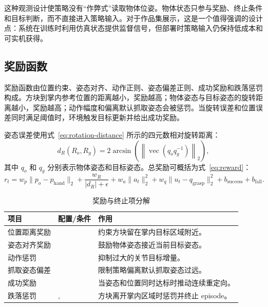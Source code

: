 这种观测设计使策略没有“作弊式”读取物体位姿。物体状态只参与奖励、终止条件和目标判断，而不直接进入策略输入。对于作品集展示，这是一个值得强调的设计点：系统在训练时利用仿真状态提供监督信号，但部署时策略输入仍保持低成本和可实机获得。

\subsection{奖励函数}

奖励函数由位置约束、姿态对齐、动作正则、姿态偏差正则、成功奖励和跌落惩罚构成。方块到掌内参考位置的距离越小，奖励越高；物体姿态与目标姿态的旋转距离越小，奖励越高；动作幅度和偏离默认抓取姿态会被惩罚。当旋转误差和位置误差同时满足阈值时，环境触发目标更新并给出成功奖励。

姿态误差使用式~\eqref{eq:rotation-distance} 所示的四元数相对旋转距离：
\begin{equation}
\label{eq:rotation-distance}
    d_R(R_o,R_g)=2\arcsin\left(\left\|\operatorname{vec}\left(q_o q_g^{-1}\right)\right\|_2\right),
\end{equation}
其中 $q_o$ 和 $q_g$ 分别表示物体姿态和目标姿态。总奖励可概括为式~\eqref{eq:reward}：
\begin{equation}
\label{eq:reward}
    r_t=w_p\lVert p_o-p_{\mathrm{hand}}\rVert_2
       +\frac{w_R}{|d_R|+\epsilon}
       +w_a\lVert a_t\rVert_2^2
       +w_q\lVert u_t-q_{\mathrm{grasp}}\rVert_2^2
       +b_{\mathrm{success}}+b_{\mathrm{fall}} .
\end{equation}

\begin{table}[H]
\centering
\caption{奖励与终止项分解}
\begin{tabularx}{\textwidth}{p{}p{}Y}
\toprule
项目 & 配置/条件 & 作用 \\
\midrule
位置距离奖励 &  & 约束方块留在掌内目标区域附近。\\
姿态对齐奖励 &  & 鼓励物体姿态接近当前目标姿态。\\
动作惩罚 &  & 抑制过大的关节目标增量。\\
抓取姿态偏差 &  & 限制策略偏离默认抓取姿态过远。\\
成功奖励 &  & 当姿态和位置同时达标时推动连续重定向。\\
跌落惩罚 & ,  & 方块离开掌内区域时惩罚并终止 episode。\\
\bottomrule
\end{tabularx}
\end{table}

